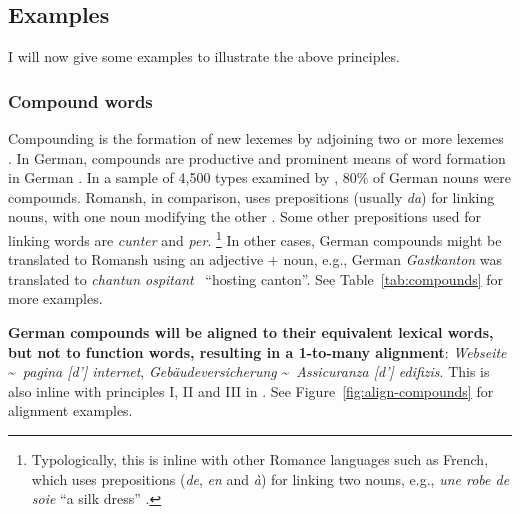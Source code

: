 

\subsection{Examples}\label{sec:gold-standard-examples}
I will now give some examples to illustrate the above principles.
\subsubsection{Compound words}
Compounding is the formation of new lexemes by adjoining two or more lexemes \autocite{bauer1988}. In German, compounds are productive and prominent means of word formation in German \autocite{clematide2018}. 
In a sample of 4,500 types examined by \textcite{clematide2018}, 80\% of German nouns were compounds.
Romansh, in comparison, uses prepositions (usually \emph{da}) for linking nouns, with one noun modifying the other \autocite{valladers}. Some other prepositions used for linking words are \emph{cunter} and \emph{per}.
\footnote{Typologically, this is inline with other Romance languages such as French, which uses prepositions (\emph{de}, \emph{en} and \emph{à}) for linking two nouns, e.g., \emph{une robe de soie} \enquote{a silk dress} \autocite[510]{price2008}.}
In other cases, German compounds might be translated to Romansh using an adjective + noun, e.g., German \emph{Gastkanton} was translated to \emph{chantun ospitant} ~\enquote{hosting canton}.
See Table~\ref{tab:compounds} for more examples.

\textbf{German compounds will be aligned to their equivalent lexical words, but not to function words, resulting in a 1-to-many alignment}: \emph{Webseite} \textasciitilde~\emph{pagina [d'] internet}, \emph{Gebäudeversicherung} \textasciitilde~\emph{Assicuranza [d'] edifizis}. 
This is also inline with principles I, II and III in \textcite{clematide2018}. 
See Figure~\ref{fig:align-compounds} for alignment examples.

